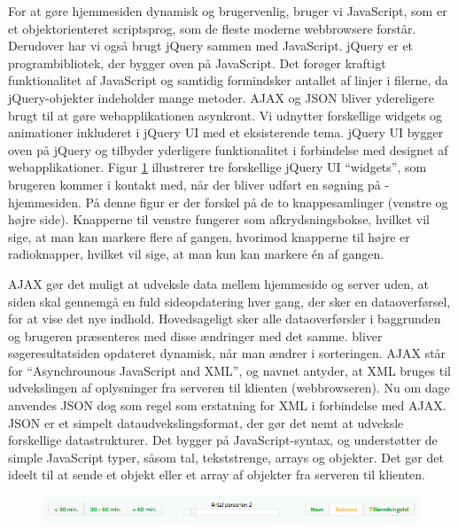 For at gøre hjemmesiden dynamisk og brugervenlig, bruger vi JavaScript\cite{javascriptwiki}, som er et objektorienteret scriptsprog, som de fleste moderne webbrowsere forstår. Derudover har vi også brugt jQuery\cite{jquery} sammen med JavaScript. jQuery er et programbibliotek, der bygger oven på JavaScript. Det forøger kraftigt funktionalitet af JavaScript og samtidig formindsker antallet af linjer i filerne, da jQuery-objekter indeholder mange metoder. AJAX\cite{ajaxwiki} og JSON\cite{jsonwiki} bliver ydereligere brugt til at gøre webapplikationen asynkront. Vi udnytter forskellige widgets og animationer inkluderet i jQuery UI\cite{jqueryuiwiki} med et eksisterende tema. jQuery UI bygger oven på jQuery og tilbyder yderligere funktionalitet i forbindelse med designet af webapplikationer. Figur \ref{fig:toolbar} illustrerer tre forskellige jQuery UI ``widgets'', som brugeren kommer i kontakt med, når der bliver udført en søgning på \Foodl{}-hjemmesiden. På denne figur er der forskel på de to knappesamlinger (venstre og højre side). Knapperne til venstre fungerer som afkrydsningsbokse, hvilket vil sige, at man kan markere flere af gangen, hvorimod knapperne til højre er radioknapper, hvilket vil sige, at man kun kan markere én af gangen. 

AJAX gør det muligt at udveksle data mellem hjemmeside og server uden, at siden skal gennemgå en fuld sideopdatering hver gang, der sker en dataoverførsel, for at vise det nye indhold. Hovedsageligt sker alle dataoverførsler i baggrunden og brugeren præsenteres med disse ændringer med det samme. \Fx bliver søgeresultatsiden opdateret dynamisk, når man ændrer i sorteringen. AJAX står for ``Asynchrounous JavaScript and XML'', og navnet antyder, at XML bruges til udvekslingen af oplysninger fra serveren til klienten (webbrowseren). Nu om dage anvendes JSON dog som regel som erstatning for XML i forbindelse med AJAX. JSON er et simpelt dataudvekslingsformat, der gør det nemt at udveksle forskellige datastrukturer. Det bygger på JavaScript-syntax, og understøtter de simple JavaScript typer, såsom tal, tekststrenge, arrays og objekter. Det gør det ideelt til \fx at sende et objekt eller et array af objekter fra serveren til klienten.

\begin{figure}[H]
\centering
\includegraphics[scale=0.5]{billeder/foodl/toolbar.png}
\label{fig:toolbar}
\end{figure}

